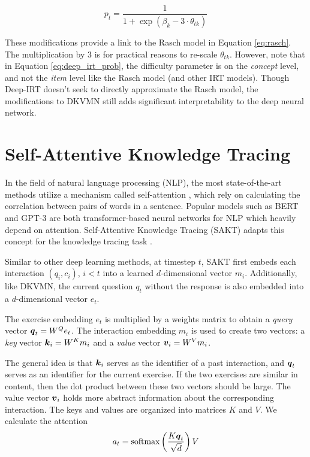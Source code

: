 \begin{equation}
  p_t = \frac{1}{1 + \exp\left( \beta_k - 3\cdot \theta_{tk} \right)}
  \label{eq:deep_irt_prob}
\end{equation}

These modifications provide a link to the Rasch model in Equation \ref{eq:rasch}. The multiplication by 3 is for practical reasons to re-scale $\theta_{tk}$. However, note that in Equation \ref{eq:deep_irt_prob}, the difficulty parameter is on the \textit{concept} level, and not the \textit{item} level like the Rasch model (and other IRT models). Though Deep-IRT doesn't seek to directly approximate the Rasch model, the modifications to DKVMN still adds significant interpretability to the deep neural network.


\section{Self-Attentive Knowledge Tracing}\label{sec:sakt}
In the field of natural language processing (NLP), the most state-of-the-art methods utilize a mechanism called self-attention \cite{vaswani2017}, which rely on calculating the correlation between pairs of words in a sentence. Popular models such as BERT \cite{bert} and GPT-3 \cite{gpt3} are both transformer-based neural networks for NLP which heavily depend on attention. Self-Attentive Knowledge Tracing (SAKT) adapts this concept for the knowledge tracing task \cite{pandey2019}. 

Similar to other deep learning methods, at timestep $t$, SAKT first embeds each interaction $(q_i, c_i)$, $i<t$ into a learned $d$-dimensional vector $m_i$. Additionally, like DKVMN, the current question $q_t$ without the response is also embedded into a $d$-dimensional vector $e_t$. 

The exercise embedding $e_t$ is multiplied by a weights matrix to obtain a \textit{query} vector $\boldsymbol{q}_t = W^{Q}e_t$. The interaction embedding $m_i$ is used to create two vectors: a \textit{key} vector $\boldsymbol{k}_i = W^{K}m_i$ and a \textit{value} vector $\boldsymbol{v}_i = W^V m_i$. 

The general idea is that $\boldsymbol{k}_i$ serves as the identifier of a past interaction, and $\boldsymbol{q}_t$ serves as an identifier for the current exercise. If the two exercises are similar in content, then the dot product between these two vectors should be large. The value vector $\boldsymbol{v}_i$ holds more abstract information about the corresponding interaction. The keys and values are organized into matrices $K$ and $V$. We calculate the attention
\begin{equation}
  a_{t} = \text{softmax}\left(\frac{K \boldsymbol{q}_t}{\sqrt{d}} \right) V
  \label{eq:attn_sakt}
\end{equation}


